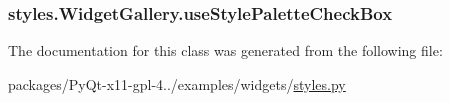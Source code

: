 \subsubsection[{use\+Style\+Palette\+Check\+Box}]{\setlength{\rightskip}{0pt plus 5cm}styles.\+Widget\+Gallery.\+use\+Style\+Palette\+Check\+Box}\label{classstyles_1_1WidgetGallery_a184918aa9be867e1ce552c1c584eb862}


The documentation for this class was generated from the following file\+:\begin{DoxyCompactItemize}
\item 
packages/\+Py\+Qt-\/x11-\/gpl-\/4../examples/widgets/\hyperlink{styles_8py}{styles.\+py}\end{DoxyCompactItemize}
